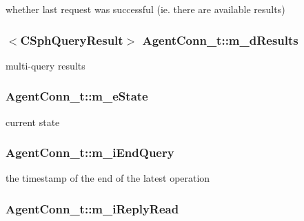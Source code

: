 whether last request was successful (ie. there are available results) 

\hypertarget{structAgentConn__t_acd760dc9dfe66a5d71ffdd75de3e821f}{
\subsubsection[{m\-\_\-d\-Results}]{$<${\bf C\-Sph\-Query\-Result}$>$ Agent\-Conn\-\_\-t\-::m\-\_\-d\-Results}}\label{structAgentConn__t_acd760dc9dfe66a5d71ffdd75de3e821f}


multi-\/query results 

\hypertarget{structAgentConn__t_a1b1c48b4720544ea723a0d27f604c422}{
\subsubsection[{m\-\_\-e\-State}]{ Agent\-Conn\-\_\-t\-::m\-\_\-e\-State}}\label{structAgentConn__t_a1b1c48b4720544ea723a0d27f604c422}


current state 

\hypertarget{structAgentConn__t_aa72a5c38f23e61a419f0bf80509aa337}{
\subsubsection[{m\-\_\-i\-End\-Query}]{ Agent\-Conn\-\_\-t\-::m\-\_\-i\-End\-Query}}\label{structAgentConn__t_aa72a5c38f23e61a419f0bf80509aa337}


the timestamp of the end of the latest operation 

\hypertarget{structAgentConn__t_afa5270ede328ecb5c146a823807d44ab}{
\subsubsection[{m\-\_\-i\-Reply\-Read}]{ Agent\-Conn\-\_\-t\-::m\-\_\-i\-Reply\-Read}}\label{structAgentConn__t_afa5270ede328ecb5c146a823807d44ab}


